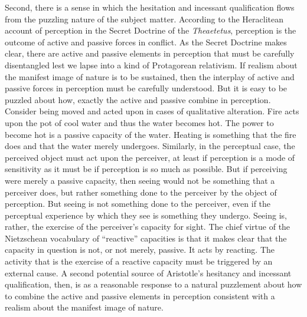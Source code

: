 Second, there is a sense in which the hesitation and incessant qualification flows from the puzzling nature of the subject matter. According to the Heraclitean account of perception in the Secret Doctrine of the \emph{Theaetetus}, perception is the outcome of active and passive forces in conflict. As the Secret Doctrine makes clear, there are active and passive elements in perception that must be carefully disentangled lest we lapse into a kind of Protagorean relativism. If realism about the manifest image of nature is to be sustained, then the interplay of active and passive forces in perception must be carefully understood. But it is easy to be puzzled about how, exactly the active and passive combine in perception. Consider being moved and acted upon in cases of qualitative alteration. Fire acts upon the pot of cool water and thus the water becomes hot. The power to become hot is a passive capacity of the water. Heating is something that the fire does and that the water merely undergoes. Similarly, in the perceptual case, the perceived object must act upon the perceiver, at least if perception is a mode of sensitivity as it must be if perception is so much as possible. But if perceiving were merely a passive capacity, then seeing would not be something that a perceiver does, but rather something done to the perceiver by the object of perception. But seeing is not something done to the perceiver, even if the perceptual experience by which they see is something they undergo. Seeing is, rather, the exercise of the perceiver's capacity for sight. The chief virtue of the Nietzschean vocabulary of ``reactive'' capacities is that it makes clear that the capacity in question is not, or not merely, passive. It acts by reacting. The activity that is the exercise of a reactive capacity must be triggered by an external cause. A second potential source of Aristotle's hesitancy and incessant qualification, then, is as a reasonable response to a natural puzzlement about how to combine the active and passive elements in perception consistent with a realism about the manifest image of nature.

